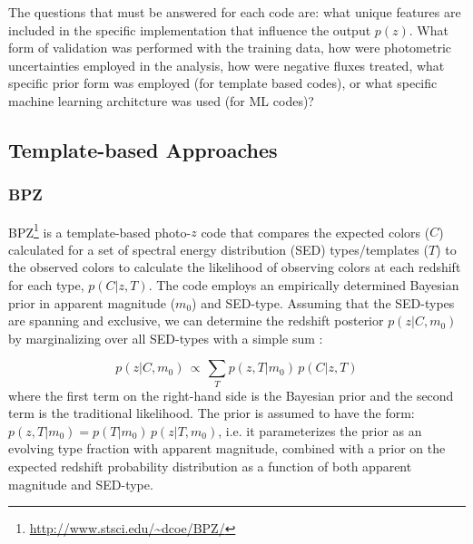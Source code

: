 \documentclass[usenatbib]{mn2e}
\newcommand{\red}[1]{\textcolor{red}{#1}}
\newcommand{\scc}[1]{\textcolor{scc}{#1}}%
\begin{document}
The questions that must be answered for each code are: what unique features are included in the specific implementation that influence the output $p(z)$.  What form of validation was performed with the training data, how were photometric uncertainties employed in the analysis, how were negative fluxes treated, what specific prior form was employed (for template based codes), or what specific machine learning architcture was used (for ML codes)? 
\subsection{Template-based Approaches}
\label{sec:templatecodes}

\subsubsection{BPZ}
\label{sec:BPZ}

\textsc{BPZ}\footnote{\url{http://www.stsci.edu/~dcoe/BPZ/}} \citep[Bayesian Photometric Redshift,][]{Benitez:00} is a template-based photo-$z$ code that compares the expected colors ($C$) calculated for a set of spectral energy distribution (SED) types/templates ($T$) to the observed colors to calculate the likelihood of observing colors at each redshift for each type, $p(C|z,T)$. The code employs an empirically determined Bayesian prior in apparent magnitude ($m_0$) and SED-type. Assuming that the SED-types are spanning and exclusive, we can determine the redshift posterior $p(z|C,m_0)$ by marginalizing over all SED-types with a simple sum \citep[Eq.~3 from][]{Benitez:00}:

\begin{equation} \label{eq:redshift_posterior}
p(z|C,m_0)\,\propto\, \sum_{T}p(z,T|m_0)\,p(C|z,T)
\end{equation}
\noindent where the first term on the right-hand side is the Bayesian prior and the second term is the traditional likelihood. The prior is assumed to have the form: $p(z,T|m_0)=p(T|m_0)\,p(z|T,m_0)$, i.e. it parameterizes the prior as an evolving type fraction with apparent magnitude, combined with a prior on the expected redshift probability distribution as a function of both apparent magnitude and SED-type.
\end{document}
